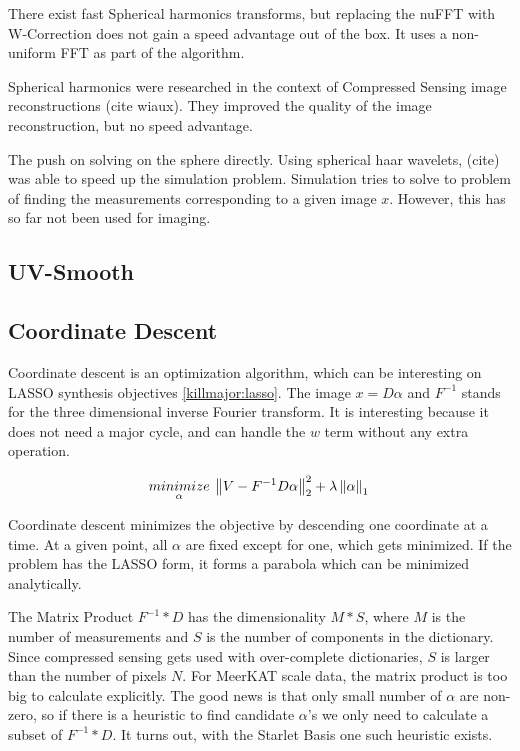 There exist fast Spherical harmonics transforms, but replacing the nuFFT with W-Correction does not gain a speed advantage out of the box. It uses a non-uniform FFT as part of the algorithm.

Spherical harmonics were researched in the context of Compressed Sensing image reconstructions (cite wiaux). They improved the quality of the image reconstruction, but no speed advantage.

The push on solving on the sphere directly. Using spherical haar wavelets, (cite) was able to speed up the simulation problem. Simulation tries to solve to problem of finding the measurements corresponding to a given image $x$. However, this has so far not been used for imaging.


\subsection{UV-Smooth}



\subsection{Coordinate Descent}
Coordinate descent is an optimization algorithm, which can be interesting on LASSO synthesis objectives \eqref{killmajor:lasso}. The image $x = D\alpha$ and $F^{-1}$ stands for the three dimensional inverse Fourier transform. It is interesting because it does not need a major cycle, and can handle the $w$ term without any extra operation.


\begin{equation}\label{killmajor:lasso}
\underset{\alpha}{minimize} \: \left \| V - F^{-1}D \alpha \right \|_2^2 + \lambda \left \| \alpha \right \|_1 \\
\end{equation}

Coordinate descent minimizes the objective by descending one coordinate at a time. At a given point, all $\alpha$ are fixed except for one, which gets minimized. If the problem has the LASSO form, it forms a parabola which can be minimized analytically.

The Matrix Product $F^{-1}*D$ has the dimensionality $M*S$, where $M$ is the number of measurements and $S$ is the number of components in the dictionary. Since compressed sensing gets used with over-complete dictionaries, $S$ is larger than the number of pixels $N$. For MeerKAT scale data, the matrix product is too big to calculate explicitly.  The good news is that only small number of $\alpha$ are non-zero, so if there is a heuristic to find candidate $\alpha$'s we only need to calculate a subset of $F^{-1}*D$. It turns out, with the Starlet Basis one such heuristic exists.


